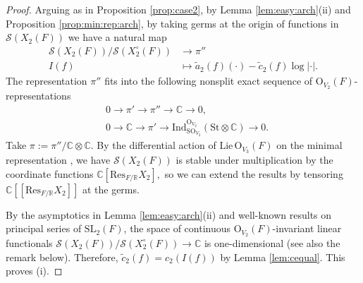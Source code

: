 \documentclass[11pt,a4paper,reqno]{amsart}
\theoremstyle{remark}
\numberwithin{equation}{section}
\newcommand{\SL}{\mathrm{SL}}
\newcommand{\CC}{\mathbb{C}}
\newcommand{\RR}{\mathbb{R}}
\theoremstyle{definition}
\numberwithin{equation}{section}
\begin{document}
\begin{proof}
     Arguing as in Proposition \ref{prop:case2}, by Lemma \ref{lem:easy:arch}(ii) and Proposition \ref{prop:min:rep:arch}, by taking germs at the origin of functions in $\mathcal{S}(X_{2}(F))$ we have a natural  map 
    \begin{align*}
          \mathcal{S}(X_{2}(F))/\mathcal{S}(X_{2}^\circ(F))&\longrightarrow \pi''\\
          I(f)&\mapsto \tilde{a}_2(f)(\cdot)-\tilde{c}_2(f)\log|\cdot|.
    \end{align*}
  The representation $\pi''$ fits into the following nonsplit exact sequence of $\mathrm{O}_{V_2}(F)$-representations
    \begin{align*}
        &0 \longrightarrow \pi' \longrightarrow \pi''\longrightarrow \CC\longrightarrow 0,\\
       & 0 \longrightarrow \CC \longrightarrow \pi'\longrightarrow \mathrm{Ind}_{\mathrm{SO}_{V_2}}^{\mathrm{O}_{V_2}}(\mathrm{St} \otimes \CC)\longrightarrow 0.
    \end{align*}
    Take $\pi:=\pi''/\CC\otimes\CC.$ By the differential action of $\mathrm{Lie}\,\mathrm{O}_{V_3}(F)$ on the minimal representation  \cite{Kobayashi:Mano, minrep:real}, we have $\mathcal{S}(X_2(F))$ is stable under multiplication by the coordinate functions $\CC[\mathrm{Res}_{F/\RR}X_{2}],$ so we can extend the results by tensoring $\CC[[\mathrm{Res}_{F/\RR}X_{2}]]$ at the germs. 
    
    By the asymptotics in Lemma \ref{lem:easy:arch}(ii) and well-known results on principal series of $\SL_2(F)$, the space of continuous $\mathrm{O}_{V_2}(F)$-invariant linear functionals $\mathcal{S}(X_2(F))/\mathcal{S}(X_2^\circ(F))\rightarrow \CC$ is one-dimensional (see also the remark below). Therefore, $\tilde{c}_2(f)=c_2(I(f))$
    by Lemma \ref{lem:cequal}. This proves (i).
    

\end{proof}
\end{document}
